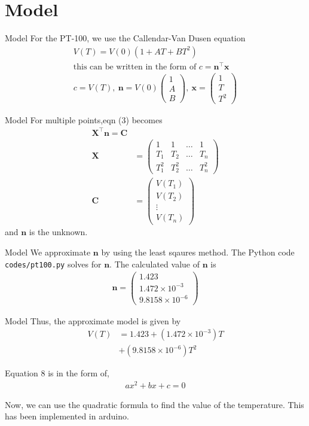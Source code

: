 \documentclass{beamer}
\providecommand{\brak}[1]{\ensuremath{\left(#1\right)}}
\theoremstyle{remark}
\newcommand{\myvec}[1]{\ensuremath{\begin{pmatrix}#1\end{pmatrix}}}
\renewcommand{\vec}[1]{\mathbf{\boldsymbol{#1}}}
\begin{document}
\section{Model}
\begin{frame}{Model}
    For the PT-100, we use the Callendar-Van Dusen equation
    \begin{align}
        V(T)       = V(0)\brak{1+AT+BT^2} \\
        \text{this can be written in the form of } c  = \vec{n}^\top\vec{x}  \\
        c = V(T),\ \vec{n} = V(0)\myvec{1   \\A\\B},\ \vec{x} = \myvec{1\\T\\T^2}
    \end{align}
\end{frame}

\begin{frame}{Model}
    For multiple points,eqn (3) becomes
    \begin{align}
        \vec{X}^\top\vec{n} = \vec{C}                   \\
        \vec{X} & = \myvec{1           & 1 & \ldots & 1 \\T_1&T_2&\ldots&T_n\\T_1^2&T_2^2&\ldots&T_n^2} \\
        \vec{C} & = \myvec{V\brak{T_1}                  \\V\brak{T_2}\\\vdots\\V\brak{T_n}}
    \end{align}
    and $\vec{n}$ is the unknown.
\end{frame}

\begin{frame}{Model}
    We approximate $\vec{n}$ by using the least sqaures method. The Python code
    \texttt{codes/pt100.py} solves for $\vec{n}$.
    The calculated value of $\vec{n}$ is
    \begin{align}
        \vec{n} = \myvec{1.423 \\1.472\times10^{-3}\\9.8158\times10^{-6}}
    \end{align}
\end{frame}

\begin{frame}{Model}
Thus, the approximate model is given by
\begin{align}
    V(T) & = 1.423 + \brak{1.472\times10^{-3}}T \nonumber \\
         & + \brak{9.8158\times10^{-6}}T^2
\end{align}

Equation 8 is in the form of,
\begin{align}
    ax^2 + bx + c=0 
\end{align}

Now, we can use the quadratic formula to find the value of the temperature.
This has been implemented in arduino.

\end{frame}
\end{document}
